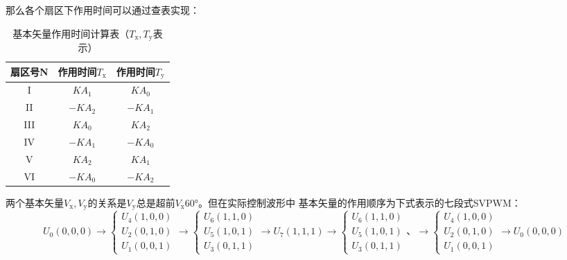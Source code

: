 那么各个扇区下作用时间可以通过查表实现：
\begin{table}[H]
    \centering
    \begin{tabular}{|c|c|c|}
        \hline
        扇区号N&作用时间\(T_{\mathrm{x}}\)&作用时间\(T_{\mathrm{y}}\)\\
        \hline
        I&\(KA_1\)&\(KA_0\)\\
        \hline
        II&\(-KA_2\)&\(-KA_1\)\\
        \hline
        III&\(KA_0\)&\(KA_2\)\\
        \hline
        IV&\(-KA_1\)&\(-KA_0\)\\
        \hline
        V&\(KA_2\)&\(KA_1\)\\
        \hline
        VI&\(-KA_0\)&\(-KA_2\)\\
        \hline
    \end{tabular}
    \caption{基本矢量作用时间计算表（\(T_{\mathrm{x}},T_{\mathrm{y}}\)表示）}
    \label{tab:基本矢量作用时间计算表(Tx,Ty表示)}
\end{table}

两个基本矢量\(V_{\mathrm{x}},V_{\mathrm{y}}\)的关系是\(V_{\mathrm{y}}\)总是超前\(V_{\mathrm{x}}\)60°。但在实际控制波形中
基本矢量的作用顺序为下式表示的七段式SVPWM：
\begin{equation*}
    U_0(0,0,0)\to
    \begin{cases}U_4(1,0,0)\\U_2(0,1,0)\\U_1(0,0,1)\end{cases}
    \to
    \begin{cases}U_6(1,1,0)\\U_5(1,0,1)\\U_3(0,1,1)\end{cases}
    \to
    U_7(1,1,1)
    \to
    \begin{cases}U_6(1,1,0)\\U_5(1,0,1)\\U_3(0,1,1)\end{cases}、
    \to
    \begin{cases}U_4(1,0,0)\\U_2(0,1,0)\\U_1(0,0,1)\end{cases}
    \to
    U_0(0,0,0)
\end{equation*}

